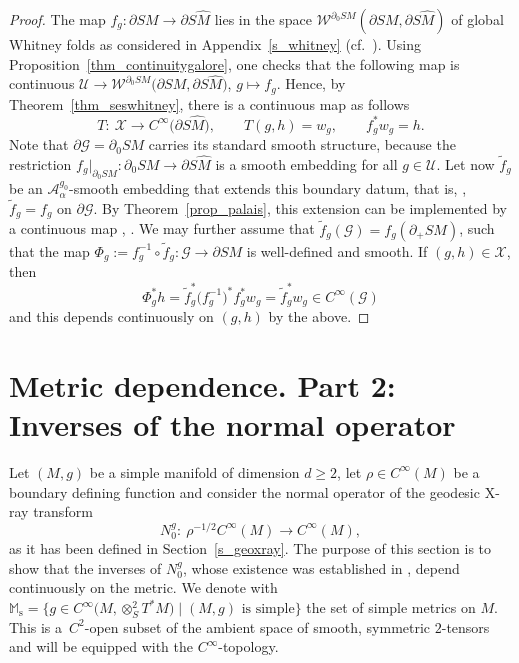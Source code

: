 \documentclass[10pt,a4paper]{amsart}
\numberwithin{equation}{section}
\theoremstyle{definition}
\newcommand{\M}{\mathbb{M}}
\newcommand{\Ms}{\M_{\mathrm{s}}}
\newcommand{\1}{{\bf 1}}
\begin{document}
\begin{proof}
	The map $f_g\colon \partial SM\to \partial S\hat M$ lies in the space $\mathcal W^{\partial_0SM}(\partial SM,\partial S\hat M)$ of global Whitney folds as considered in Appendix~\ref{s_whitney} (cf.~\cite[Section~5.2]{PSU23}). Using Proposition~\ref{thm_continuitygalore}, one checks that the following map is continuous $\mathcal U \to \mathcal W^{\partial_0SM}\bigl(\partial SM, \partial S\hat M\bigr)$, $ g\mapsto f_g$.
Hence, by Theorem~\ref{thm_seswhitney}, there is a continuous map as follows
\[
T\colon\ \mathcal X \to 	C^\infty\bigl(\partial S\hat M\bigr),\qquad T(g,h) = w_g,\qquad f_g^*w_g =h.
\]
\sloppy Note that $\partial \mathcal G = \partial_0SM$ carries its standard smooth structure, because the restriction $f_g|_{\partial_0SM} \colon \partial_0SM\to \partial S\hat M$ is a smooth embedding for all $g\in \mathcal U$. Let now $\tilde f_g$ be an $\mathcal A_\alpha^{g_0}$-smooth embedding that extends this boundary datum, that is,
, $ \tilde f_ g= f_g$ on $ \partial \mathcal G$.
By Theorem~\ref{prop_palais}, this extension can be implemented by a continuous map
, .
We may further assume that $\tilde f_g(\mathcal G) = f_g(\partial_+SM)$, such that the map
$
	\Phi_g:= f^{-1}_g\circ \tilde f_g\colon \mathcal G\to \partial SM
$ is well-defined and smooth. If $(g,h)\in \mathcal X$, then
\[
	\Phi_g^*h = \tilde f_g^* \bigl(f_g^{-1}\bigr)^* f_g^* w_g = \tilde f_g^* w_g \in C^\infty(\mathcal G)
\]
and this depends continuously on $(g,h)$ by the above.
\end{proof}

\section{Metric dependence. Part 2: Inverses of the normal operator} \label{s_verstappen}

Let $(M,g)$ be a simple manifold of dimension $d\ge 2$, let $\rho\in C^\infty(M)$ be a boundary defining function and consider the normal operator of the geodesic X-ray transform
\begin{equation*}
N^g_0 \colon\ \rho^{-1/2}C^\infty(M)\rightarrow C^\infty(M),
\end{equation*}
as it has been defined in Section~\ref{s_geoxray}. The purpose of this section is to show that the inverses of $N_0^g$, whose existence was established in \cite{MNP19a}, depend continuously on the metric. We denote with
$
\Ms=\big\{g\in C^\infty\bigl(M,\otimes^2_ST^*M\bigr)\mid (M,g)\text{ is simple}\big\}
$
the set of simple metrics on $M$. This is a~$C^2$-open subset of the ambient space of smooth, symmetric $2$-tensors and will be equipped with the $C^\infty$-topology.
\end{document}
